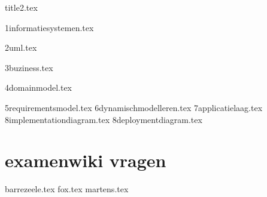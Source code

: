 \documentclass[a4paper,11pt]{article}
\begin{document}


{title2.tex}

\clearpage

\thispagestyle{empty}

\tableofcontents

\clearpage




{1informatiesystemen.tex}

{2uml.tex}

{3buziness.tex}

{4domainmodel.tex}

{5requirementsmodel.tex}
{6dynamischmodelleren.tex}
{7applicatielaag.tex}
{8implementationdiagram.tex}
{8deploymentdiagram.tex}

\section{examenwiki vragen}
{barrezeele.tex}
{fox.tex}
{martens.tex}




\listofalgorithms
\clearpage
\listoffigures
\clearpage
\listoftables
\clearpage

\printglossary[title=Termen,toctitle=Lijst van termen]

\printglossary[type=\acronymtype]


\clearpage
\printsolutions
\end{document}
